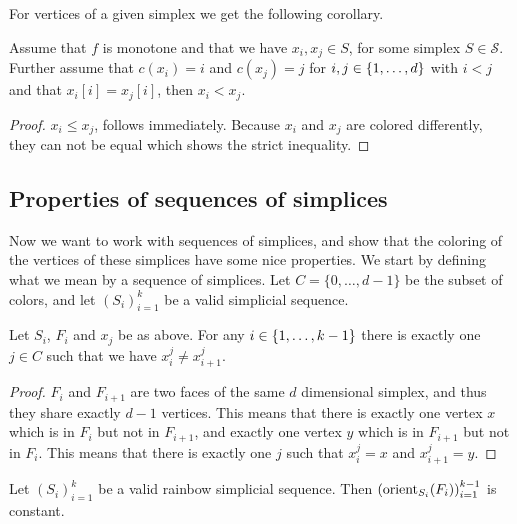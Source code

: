 For vertices of a given simplex we get the following corollary.
\begin{corollary}
	\label{cor:monotone_coloring}
	Assume that $f$ is monotone and that we have $x_i, x_j \in S$, for some simplex $S\in  \mathcal{S}$. Further assume that $c(x_i) = i$ and $c(x_j) = j$ for $i, j \in \left\{1, \dots, d\right\}$ with $i < j$ and that $x_i[i] = x_j[i]$, then $x_i < x_j$.
\end{corollary}
\begin{proof}
	$x_i \leq x_j$, follows immediately. Because $x_i$ and $x_j$ are colored differently, they can not be equal which shows the strict inequality.
\end{proof}

\subsection{Properties of sequences of simplices}

Now we want to work with sequences of simplices, and show that the coloring of the vertices of these simplices have some nice properties. We start by defining what we mean by a sequence of simplices. Let $C = \{0, \dots, d-1\}$ be the subset of colors, and let $\left(S_i\right)_{i=1}^k$ be a valid simplicial sequence.
\begin{lemma}
	Let $S_i$, $F_i$ and $x_j$ be as above. For any $i \in \left\{1, \dots, k-1\right\}$ there is exactly one $j \in C$ such that we have $x_i^j \neq x_{i+1}^j$.
\end{lemma}
\begin{proof}
	$F_i$ and $F_{i+1}$ are two faces of the same $d$ dimensional simplex, and thus they share exactly $d-1$ vertices. This means that there is exactly one vertex $x$ which is in $F_i$ but not in $F_{i+1}$, and exactly one vertex $y$ which is in $F_{i+1}$ but not in $F_i$. This means that there is exactly one $j$ such that $x_i^j = x$ and $x_{i+1}^j = y$.
\end{proof}

\begin{lemma}
	\label{lem:consistent_orientation_of_transition_faces}
	Let $\left(S_i\right)_{i=1}^{k}$ be a valid rainbow simplicial sequence. Then $\left(\operatorname{orient}_{S_i}(F_i)\right)_{i=1}^{k-1}$ is constant.
\end{lemma}

